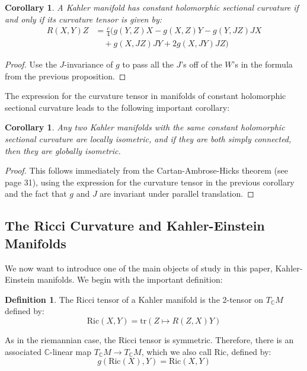 \documentclass[11pt]{amsart}
\newtheorem{cor}[subsection]{Corollary}
\theoremstyle{definition}
\newtheorem{definition}[subsection]{Definition}
\def \C{ \mathbb{C} }
\def \Ric{ \text{Ric} }
\def \tr{ \text{tr} }
\begin{document}
\begin{cor} A Kahler manifold has constant holomorphic sectional curvature if and only if its curvature tensor is given by:
%
\begin{align*}
R(X,Y)Z &= \frac{c}{4} (g(Y,Z)X - g(X,Z)Y - g(Y,JZ)JX  \\
& \quad + g(X, JZ)JY + 2 g(X,JY)JZ )
\end{align*}
%
\end{cor}

\begin{proof}  Use the $J$-invariance of $g$ to pass all the $J$'s off of the $W$'s in the formula from the previous proposition.
\end{proof}

The expression for the curvature tensor in manifolds of constant holomorphic sectional curvature leads to the following important corollary:

\begin{cor} Any two Kahler manifolds with the same constant holomorphic sectional curvature are locally isometric, and if they are both simply connected, then they are globally isometric.
\end{cor}

\begin{proof} This follows immediately from the Cartan-Ambrose-Hicks theorem (see \cite{CE} page 31), using the expression for the curvature tensor in the previous corollary and the fact that $g$ and $J$ are invariant under parallel translation.
\end{proof}

\subsection{ The Ricci Curvature and Kahler-Einstein Manifolds }

We now want to introduce one of the main objects of study in this paper, Kahler-Einstein manifolds.  We begin with the important definition:
%
\begin{definition} The Ricci tensor of a Kahler manifold is the 2-tensor on $T_{\C} M$ defined by:
$$ \Ric (X, Y) = \tr( Z \mapsto R(Z,X)Y )$$
\end{definition}
%
As in the riemannian case, the Ricci tensor is symmetric.  Therefore, there is an associated $\C$-linear map $T_{\C} M \rightarrow T_{\C} M$, which we also call $\Ric$, defined by:
%
$$ g( \Ric (X), Y ) = \Ric ( X, Y ) $$
\end{document}
